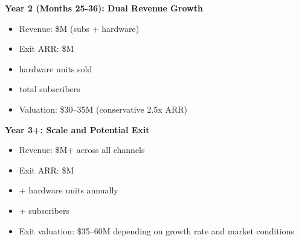 \textbf{Year 2 (Months 25-36): Dual Revenue Growth}
\begin{itemize}
  \item Revenue: \$M (subs + hardware)
  \item Exit ARR: \$M
  \item \numint{\hwCustomersYearTwo} hardware units sold
  \item \numint{\totalSubsYearTwo} total subscribers
  \item Valuation: \$30--35M (conservative \num{2.5}x ARR)
\end{itemize}

\textbf{Year 3+: Scale and Potential Exit}
\begin{itemize}
  \item Revenue: \$M+ across all channels
  \item Exit ARR: \$M
  \item \numint{\hwCustomersYearThree}+ hardware units annually
  \item \numint{\totalSubsYearThree}+ subscribers
  \item Exit valuation: \$35--60M depending on growth rate and market conditions
\end{itemize}